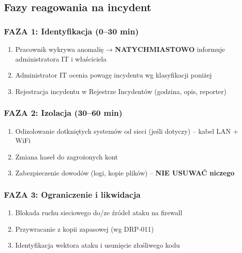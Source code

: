 \documentclass[12pt,a4paper]{article}
\providecommand{\tightlist}{\setlength{\itemsep}{0pt}\setlength{\parskip}{0pt}}
\begin{document}
\subsection{Fazy reagowania na
incydent}\label{fazy-reagowania-na-incydent}

\subsubsection*{FAZA 1: Identyfikacja (0--30
min)}\label{faza-1-identyfikacja-030-min}

\begin{enumerate}
\tightlist
\item
  Pracownik wykrywa anomalię → \textbf{NATYCHMIASTOWO} informuje
  administratora IT i właściciela
\item
  Administrator IT ocenia powagę incydentu wg klasyfikacji poniżej
\item
  Rejestracja incydentu w Rejestrze Incydentów (godzina, opis, reporter)
\end{enumerate}

\subsubsection*{FAZA 2: Izolacja (30--60
min)}\label{faza-2-izolacja-3060-min}

\begin{enumerate}
\tightlist
\item
  Odizolowanie dotkniętych systemów od sieci (jeśli dotyczy) -- kabel
  LAN + WiFi
\item
  Zmiana haseł do zagrożonych kont
\item
  Zabezpieczenie dowodów (logi, kopie plików) -- \textbf{NIE USUWAĆ
  niczego}
\end{enumerate}

\subsubsection*{FAZA 3: Ograniczenie i
likwidacja}\label{faza-3-ograniczenie-i-likwidacja}

\begin{enumerate}
\tightlist
\item
  Blokada ruchu sieciowego do/ze źródeł ataku na firewall
\item
  Przywracanie z kopii zapasowej (wg DRP-011)
\item
  Identyfikacja wektora ataku i usunięcie złośliwego kodu
\end{enumerate}
\end{document}
